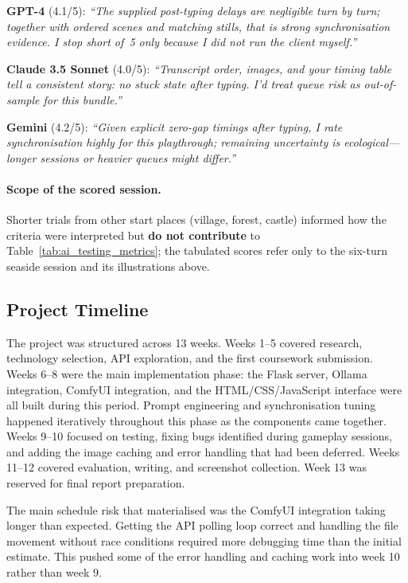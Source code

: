 \documentclass[12pt,a4paper]{article}
\begin{document}
\noindent\textbf{GPT-4} (4.1/5): \textit{``The supplied post-typing delays are negligible turn by turn; together with ordered scenes and matching stills, that is strong synchronisation evidence. I stop short of~5 only because I did not run the client myself.''}

\noindent\textbf{Claude 3.5 Sonnet} (4.0/5): \textit{``Transcript order, images, and your timing table tell a consistent story: no stuck state after typing. I'd treat queue risk as out-of-sample for this bundle.''}

\noindent\textbf{Gemini} (4.2/5): \textit{``Given explicit zero-gap timings after typing, I rate synchronisation highly for this playthrough; remaining uncertainty is ecological---longer sessions or heavier queues might differ.''}

\paragraph{Scope of the scored session.}
Shorter trials from other start places (village, forest, castle) informed how the criteria were interpreted but \textbf{do not contribute} to Table~\ref{tab:ai_testing_metrics}; the tabulated scores refer only to the six-turn seaside session and its illustrations above.

    \subsection{Project Timeline}

The project was structured across 13 weeks. Weeks 1--5 covered research, technology selection, API exploration, and the first coursework submission. Weeks 6--8 were the main implementation phase: the Flask server, Ollama integration, ComfyUI integration, and the HTML/CSS/JavaScript interface were all built during this period. Prompt engineering and synchronisation tuning happened iteratively throughout this phase as the components came together. Weeks 9--10 focused on testing, fixing bugs identified during gameplay sessions, and adding the image caching and error handling that had been deferred. Weeks 11--12 covered evaluation, writing, and screenshot collection. Week 13 was reserved for final report preparation.

The main schedule risk that materialised was the ComfyUI integration taking longer than expected. Getting the API polling loop correct and handling the file movement without race conditions required more debugging time than the initial estimate. This pushed some of the error handling and caching work into week 10 rather than week 9.
\end{document}
